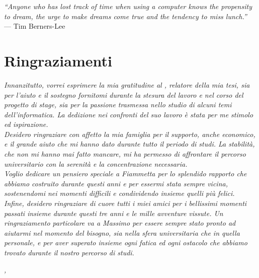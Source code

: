 
\cleardoublepage
{}
{}

\begin{flushright}{
	\slshape    
	``Anyone who has lost track of time when using a computer knows the propensity to dream, the urge to make dreams come true and the tendency to miss lunch.''} \\ 
	\medskip
	--- Tim Berners-Lee
\end{flushright}

\bigskip

\begingroup
\let\clearpage\relax
\let\cleardoublepage\relax
\let\cleardoublepage\relax

\chapter*{Ringraziamenti}

\noindent \textit{Innanzitutto, vorrei esprimere la mia gratitudine al \profTitle{} \myProf, relatore della mia tesi, sia per l'aiuto e il sostegno fornitomi durante la stesura del lavoro e nel corso del progetto di stage, sia per la passione trasmessa nello studio di alcuni temi dell'informatica. La dedizione nei confronti del suo lavoro è stata per me stimolo ed ispirazione.}\\

\noindent \textit{Desidero ringraziare con affetto la mia famiglia per il supporto, anche economico, e il grande aiuto che mi hanno dato durante tutto il periodo di studi. La stabilità, che non mi hanno mai fatto mancare, mi ha permesso di affrontare il percorso universitario con la serenità e la concentrazione necessaria.}\\

\noindent \textit{Voglio dedicare un pensiero speciale a Fiammetta per lo splendido rapporto che abbiamo costruito durante questi anni e per essermi stata sempre vicina, sostenendomi nei momenti difficili e condividendo insieme quelli più felici.}\\

\noindent \textit{Infine, desidero ringraziare di cuore tutti i miei amici per i bellissimi momenti passati insieme durante questi tre anni e le mille avventure vissute. Un ringraziamento particolare va a Massimo per essere sempre stato pronto ad aiutarmi nel momento del bisogno, sia nella sfera universitaria che in quella personale, e per aver superato insieme ogni fatica ed ogni ostacolo che abbiamo trovato durante il nostro percorso di studi.}\\
\bigskip

\noindent\textit{\myLocation, \myTime}
\hfill \myName

\endgroup

